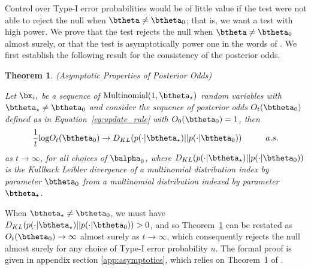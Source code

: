 \documentclass[11pt]{article}
\def\log{{\rm log}}
\newtheorem{thm}{Theorem}[section]
\begin{document}
Control over Type-I error probabilities would be of little value if the test were not able to reject the null when $\btheta \neq \btheta_0$; that is, we want a test with high power. We prove that the test rejects the null when $\btheta \neq \btheta_0$ almost surely, or that the test is asymptotically power one in the words of \cite{robbins}.
We first establish the following result for the consistency of the posterior odds.
\begin{thm}(Asymptotic Properties of Posterior Odds)
  
  \label{thm:consistency}
\noindent Let $\bx_i,$ be a sequence of $\text{Multinomial}(1,\btheta_{\star})$ random variables with $\btheta_{\star} \neq \btheta_0$ and consider the sequence of posterior odds $O_t(\btheta_0)$ defined as in Equation~\ref{eq:update_rule} with $O_0(\btheta_0)=1$, then
\begin{equation}
  \label{eq:consistency}
  \frac{1}{t} \log O_t(\btheta_0) \rightarrow D_{KL}(p(\cdot|\btheta_{\star}) || p(\cdot|\btheta_0)) \hspace{1cm} a.s.
\end{equation}
as $t \rightarrow \infty$, for all choices of $\balpha_0$, where $D_{KL}(p(\cdot|\btheta_{\star}) || p(\cdot|\btheta_0))$ is the Kullback Leibler divergence of a multinomial distribution index by parameter $\btheta_0$ from a multinomial distribution indexed by parameter $\btheta_{\star}$.
\end{thm}
\noindent When $\btheta_{\star} \neq \btheta_0$, we must have $D_{KL}(p(\cdot|\btheta_{\star}) || p(\cdot|\btheta_0)) > 0$, and so Theorem~\ref{thm:consistency} can be restated as $O_t(\btheta_0) \rightarrow \infty$ almost surely as $t \rightarrow \infty$, which consequently rejects the null almost surely for any choice of Type-I error probability $u$.
The formal proof is given in appendix section \ref{app:asymptotics}, which relies on Theorem~1 of \cite{walker}.
\end{document}
